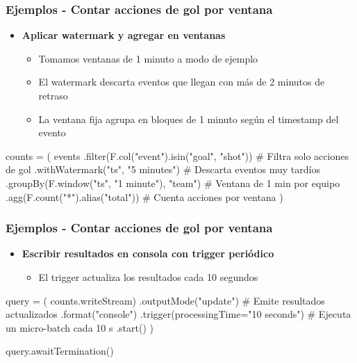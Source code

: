 \documentclass[aspectratio=169]{beamer}
\begin{document}
\begin{frame}[fragile]\frametitle{Ejemplos - Contar acciones de gol por ventana}

\begin{itemize}
	\item \textbf{Aplicar watermark y agregar en ventanas}
	\begin{itemize}
		\item Tomamos ventanas de 1 minuto a modo de ejemplo
		\item El watermark descarta eventos que llegan con más de 2 minutos de retraso
		\item La ventana fija agrupa en bloques de 1 minuto según el timestamp del evento
	\end{itemize}
\end{itemize}

\vspace{1em}

\begin{code}
\begin{python3code}
counts = (
    events
	.filter(F.col("event").isin("goal", "shot")) # Filtra solo acciones de gol
    .withWatermark("ts", "5 minutes")            # Descarta eventos muy tardíos
    .groupBy(F.window("ts", "1 minute"), "team") # Ventana de 1 min por equipo
    .agg(F.count("*").alias("total"))            # Cuenta acciones por ventana
)
\end{python3code}
\end{code}
\end{frame}

\begin{frame}[fragile]\frametitle{Ejemplos - Contar acciones de gol por ventana}

\begin{itemize}
	\item \textbf{Escribir resultados en consola con trigger periódico}
	\begin{itemize}
		\item El trigger actualiza los resultados cada 10 segundos
	\end{itemize}
\end{itemize}

\vspace{1em}

\begin{code}
\begin{python3code}
query = (
    counts.writeStream)
    .outputMode("update")                   # Emite resultados actualizados
    .format("console")                      
    .trigger(processingTime="10 seconds")   # Ejecuta un micro-batch cada 10 s
    .start()                              
)

query.awaitTermination()
\end{python3code}
\end{code}
\end{frame}
\end{document}
